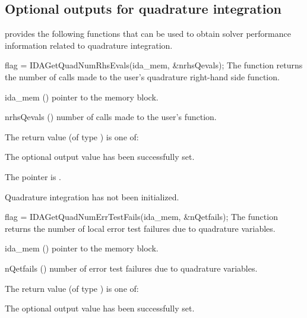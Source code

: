 {%

\subsection{Optional outputs for quadrature integration}\label{ss:quad_optional_output}

{\idas} provides the following functions that can be used to obtain solver
performance information related to quadrature integration.

{
  flag = IDAGetQuadNumRhsEvals(ida\_mem, \&nrhsQevals);
}
{
  The function  returns the 
  number of calls made to the user's quadrature right-hand side function.
}
{
  \begin{args}
  \item[ida\_mem] ()
    pointer to the {\idas} memory block.
  \item[nrhsQevals] ()
    number of calls made to the user's  function.
  \end{args}
}
{
  The return value  (of type ) is one of:
  \begin{args}
  \item[\Id{IDA\_SUCCESS}] 
    The optional output value has been successfully set.
  \item[\Id{IDA\_MEM\_NULL}]
    The  pointer is .
  \item[\Id{IDA\_NO\_QUAD}]
    Quadrature integration has not been initialized.
  \end{args}
}
{}
{
  flag = IDAGetQuadNumErrTestFails(ida\_mem, \&nQetfails);
}
{
  The function  returns the
  number of local error test failures due to quadrature variables.
}
{
  \begin{args}
  \item[ida\_mem] ()
    pointer to the {\idas} memory block.
  \item[nQetfails] ()
    number of error test failures due to quadrature variables.
  \end{args}
}
{
  The return value  (of type ) is one of:
  \begin{args}
  \item[\Id{IDA\_SUCCESS}] 
    The optional output value has been successfully set.

\end{args}}}
